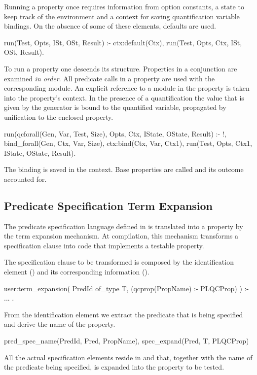 Running a property once requires information from option constants, a state to
keep track of the environment and a context for saving quantification
variable bindings.
%
On the absence of some of these elements, defaults are used.
%
\begin{yapcode}
 run(Test, Opts, ISt, OSt, Result) :-
   ctx:default(Ctx),
   run(Test, Opts, Ctx, ISt, OSt, Result).
\end{yapcode}


To run a property one descends its structure.
%
Properties in a conjunction are examined \emph{in order}.
%
All predicate calls in a property are used with the
corresponding module.
%
An explicit reference to a module in the property is taken into the
property's context.
%
In the presence of a \plqc{} quantification the value that is given by
the generator is bound to the quantified variable, propagated by
unification to the enclosed property.
%
\begin{yapcode}
 run(qcforall(Gen, Var, Test, Size),
     Opts, Ctx, IState, OState, Result) :- 
   !, bind_forall(Gen, Ctx, Var, Size),
   ctx:bind(Ctx, Var, Ctx1),
   run(Test, Opts, Ctx1,
       IState, OState, Result).
\end{yapcode}
%
The binding is saved in the context.
%
Base properties are called and its outcome accounted for.
%


\subsection{Predicate Specification Term Expansion}

The predicate specification language defined in \plqc{} is
translated into a \plqc{} property by the term expansion mechanism.
%
At compilation, this mechanism transforms a specification clause into
code that implements a testable property.


The specification clause to be transformed is composed by the
identification element () and its corresponding
information ().
%
\begin{yapcode}
 user:term_expansion(
       PredId of_type T,
       (qcprop(PropName) :- PLQCProp) ) :-
   ...
 .
\end{yapcode}
%
From the identification element we extract the predicate that is being
specified and derive the name of the property.
%
\begin{yapcode}
   pred_spec_name(PredId, Pred, PropName),
   spec_expand(Pred, T, PLQCProp)
\end{yapcode}
%
All the actual specification elements reside in  and that,
together with the name of the predicate being specified, is expanded
into the property to be tested.


